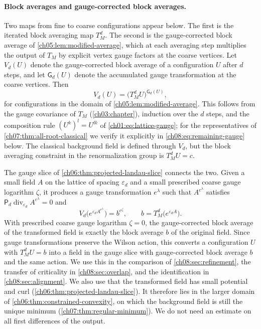 \paragraph{Block averages and gauge-corrected block averages.}
Two maps from fine to coarse configurations appear below. The first is the iterated block averaging map $T_M^d$. The second is the gauge-corrected block average of \cref{ch05:lem:modified-average}, which at each averaging step multiplies the output of $T_M$ by explicit vertex gauge factors at the coarse vertices. Let $V_d(U)$ denote the gauge-corrected block average of a configuration $U$ after $d$ steps, and let $\mathsf G_d(U)$ denote the accumulated gauge transformation at the coarse vertices. Then
\begin{equation}\label{ch08:eq:gauge-corrected-relation}
 V_d(U)=\bigl(T_M^dU\bigr)^{\mathsf G_d(U)},
\end{equation}
for configurations in the domain of \cref{ch05:lem:modified-average}. This follows from the gauge covariance of $T_M$ (\cref{ch03:chapter}), induction over the $d$ steps, and the composition rule $(U^k)^l=U^{lk}$ of \eqref{ch01:eq:lattice-gauge}; for the representatives of \cref{ch07:thm:all-root-classical} we verify it explicitly in \eqref{ch08:eq:remaining-gauge} below. The classical background field is defined through $V_d$, but the block averaging constraint in the renormalization group is $T_M^dU=c$.

The gauge slice of \cref{ch06:thm:projected-landau-slice} connects the two. Given a small field $A$ on the lattice of spacing $\varepsilon_d$ and a small prescribed coarse gauge logarithm $\zeta$, it produces a gauge transformation $e^\lambda$ such that $A^{e^\lambda}$ satisfies $\mathsf P_d\operatorname{div}_{\varepsilon_d}A^{e^\lambda}=0$ and
\[
 V_d\bigl(e^{\varepsilon_dA^{e^\lambda}}\bigr)=b^{e^\zeta},\qquad b=T_M^d\bigl(e^{\varepsilon_dA}\bigr).
\]
With prescribed coarse gauge logarithm $\zeta=0$, the gauge-corrected block average of the transformed field is exactly the block average $b$ of the original field. Since gauge transformations preserve the Wilson action, this converts a configuration $U$ with $T_M^dU=b$ into a field in the gauge slice with gauge-corrected block average $b$ and the same action. We use this in the comparison of \cref{ch08:sec:refinement}, the transfer of criticality in \cref{ch08:sec:overlap}, and the identification in \cref{ch08:sec:alignment}. We also use that the transformed field has small potential and curl (\cref{ch06:thm:projected-landau-slice}). It therefore lies in the larger domain of \cref{ch06:thm:constrained-convexity}, on which the background field is still the unique minimum (\cref{ch07:thm:regular-minimum}). We do not need an estimate on all first differences of the output.

